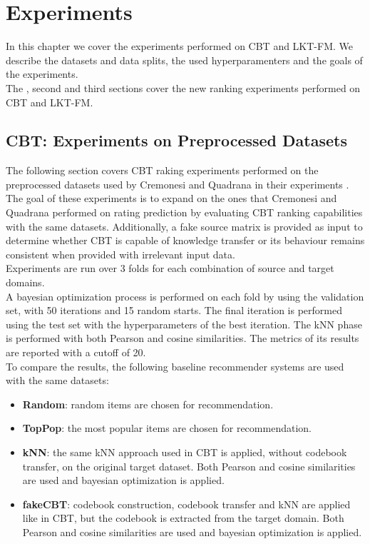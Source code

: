 \chapter{Experiments}
\label{ch:experiments}

In this chapter we cover the experiments performed on CBT and LKT-FM. We describe the datasets and data splits, the used hyperparamenters and the goals of the experiments.\\
The \cite{10.1145/2645710.2645769}, second and third sections cover the new ranking experiments performed on CBT and LKT-FM.



\section{CBT: Experiments on Preprocessed Datasets}

The following section covers CBT raking experiments performed on the preprocessed datasets used by Cremonesi and Quadrana in their experiments \cite{10.1145/2645710.2645769}. The goal of these experiments is to expand on the ones that Cremonesi and Quadrana performed on rating prediction by evaluating CBT ranking capabilities with the same datasets. Additionally, a fake source matrix is provided as input to determine whether CBT is capable of knowledge transfer or its behaviour remains consistent when provided with irrelevant input data.\\
Experiments are run over 3 folds for each combination of source and target domains.\\
A bayesian optimization process is performed on each fold by using the validation set, with 50 iterations and 15 random starts. The final iteration is performed using the test set with the hyperparameters of the best iteration. The kNN phase is performed with both Pearson and cosine similarities. The metrics of its results are reported with a cutoff of 20.\\
To compare the results, the following baseline recommender systems are used with the same datasets:
\begin{itemize}
\item \textbf{Random}: random items are chosen for recommendation.
\item \textbf{TopPop}: the most popular items are chosen for recommendation.
\item \textbf{kNN}: the same kNN approach used in CBT is applied, without codebook transfer, on the original target dataset. Both Pearson and cosine similarities are used and bayesian optimization is applied.
\item \textbf{fakeCBT}: codebook construction, codebook transfer and kNN are applied like in CBT, but the codebook is extracted from the target domain. Both Pearson and cosine similarities are used and bayesian optimization is applied.
\end{itemize}


